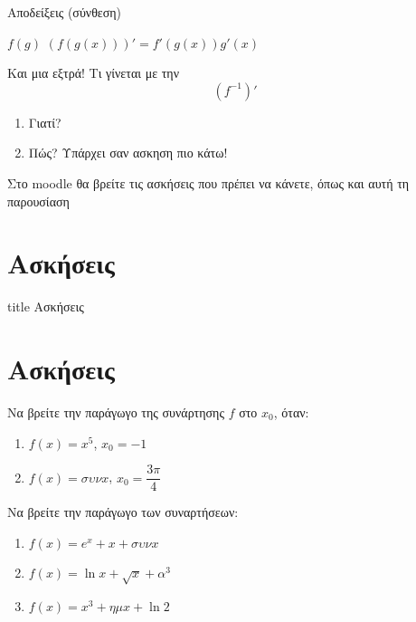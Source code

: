 \documentclass{presentation}
\begin{document}
\begin{frame}{Αποδείξεις (σύνθεση)}
    \begin{block}{$f(g)$}
        $(f(g(x)))'=f'(g(x))g'(x)$
    \end{block}
\end{frame}

\begin{frame}{Και μια εξτρά!}
    Τι γίνεται με την $$(f^{-1})'$$
    \begin{enumerate}
        \item Γιατί?
        \item Πώς? Υπάρχει σαν ασκηση πιο κάτω!
    \end{enumerate}
\end{frame}

\begin{frame}[noframenumbering]
    Στο moodle θα βρείτε τις ασκήσεις που πρέπει να κάνετε, όπως και αυτή τη παρουσίαση
\end{frame}

\section{Ασκήσεις}

\begin{frame}[noframenumbering]
    \vfill
    \centering
    \begin{beamercolorbox}[sep=8pt,center,shadow=true,rounded=true]{title}
        Ασκήσεις
    \end{beamercolorbox}
    \vfill
\end{frame}

\section{Ασκήσεις}

\begin{askisi}
    Να βρείτε την παράγωγο της συνάρτησης $f$ στο $x_0$, όταν:
    \begin{enumerate}
        \item<1-> $f(x)=x^5$, $x_0=-1$
        \item<2-> $f(x)=συνx$, $x_0=\dfrac{3π}{4}$
    \end{enumerate}

\end{askisi}

\begin{askisi}
    Να βρείτε την παράγωγο των συναρτήσεων:
    \begin{enumerate}
        \item<1-> $f(x)=e^x+x+συνx$
        \item<2-> $f(x)=\ln x+\sqrt{x}+α^3$
        \item<3-> $f(x)=x^3+ημx+\ln 2$
    \end{enumerate}

\end{askisi}
\end{document}
